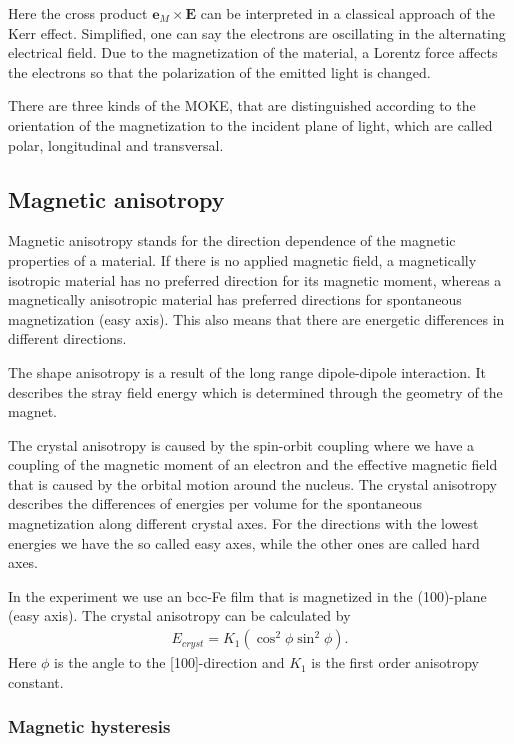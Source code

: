 \documentclass[a4paper,10pt]{scrartcl}
\begin{document}
Here the cross product $\mathbf{e}_M\times \mathbf{E}$ can be interpreted in a classical approach of the Kerr effect. Simplified, one can say the electrons are oscillating in the alternating electrical field. Due to the magnetization of the material, a Lorentz force affects the electrons so that the polarization of the emitted light is changed. 

There are three kinds of the MOKE, that are distinguished according to the orientation of the magnetization to the incident plane of light, which are called polar, longitudinal and transversal. 


\subsection{Magnetic anisotropy}

Magnetic anisotropy stands for the direction dependence of the magnetic properties of a material. If there is no applied magnetic field, a magnetically isotropic material has no preferred direction for its magnetic moment, whereas a magnetically anisotropic material has preferred directions for spontaneous magnetization (easy axis). This also means that there are energetic differences in different directions. 

The shape anisotropy is a result of the long range dipole-dipole interaction. It describes the stray field energy which is determined through the geometry of the magnet.

The crystal anisotropy is caused by the spin-orbit coupling where we have a coupling of the magnetic moment of an electron and the effective magnetic field that is caused by the orbital motion around the nucleus. The crystal anisotropy describes the differences of energies per volume for the spontaneous magnetization along different crystal axes. For the directions with the lowest energies we have the so called easy axes, while the other ones are called hard axes.

In the experiment we use an bcc-Fe film that is magnetized in the (100)-plane (easy axis). The crystal anisotropy can be calculated by
\begin{eqnarray}
 E_{cryst} = K_1(\cos^2{\phi}\sin^2{\phi}).
\end{eqnarray}
Here $\phi$ is the angle to the [100]-direction and $K_1$ is the first order anisotropy constant.

\subsubsection{Magnetic hysteresis}
\end{document}
